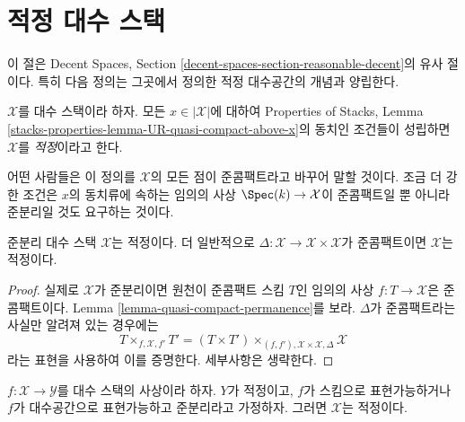 \section{적정 대수 스택}
\label{section-reasonable-decent}

\noindent
이 절은 Decent Spaces, Section
\ref{decent-spaces-section-reasonable-decent}의 유사 절이다. 특히 다음
정의는 그곳에서 정의한 적정 대수공간의 개념과 양립한다.

\begin{definition}
\label{definition-decent}
$\mathcal{X}$를 대수 스택이라 하자. 모든 $x \in |\mathcal{X}|$에 대하여
Properties of Stacks, Lemma
\ref{stacks-properties-lemma-UR-quasi-compact-above-x}의 동치인 조건들이
성립하면 $\mathcal{X}$를 {\it 적정}이라고 한다.
\end{definition}

\noindent
어떤 사람들은 이 정의를 $\mathcal{X}$의 모든 점이 준콤팩트라고 바꾸어
말할 것이다. 조금 더 강한 조건은 $x$의 동치류에 속하는 임의의 사상
$\Spec(k) \to \mathcal{X}$이 준콤팩트일 뿐 아니라 준분리일 것도 요구하는
것이다.

\begin{lemma}
\label{lemma-quasi-separated-decent}
준분리 대수 스택 $\mathcal{X}$는 적정이다. 더 일반적으로
$\Delta : \mathcal{X} \to \mathcal{X} \times \mathcal{X}$가 준콤팩트이면
$\mathcal{X}$는 적정이다.
\end{lemma}

\begin{proof}
실제로 $\mathcal{X}$가 준분리이면 원천이 준콤팩트 스킴 $T$인 임의의
사상 $f : T \to \mathcal{X}$은 준콤팩트이다. Lemma
\ref{lemma-quasi-compact-permanence}를 보라. $\Delta$가 준콤팩트라는
사실만 알려져 있는 경우에는
$$
T \times_{f, \mathcal{X}, f'} T' =
(T \times T')
\times_{(f, f'), \mathcal{X} \times \mathcal{X}, \Delta}
\mathcal{X}
$$
라는 표현을 사용하여 이를 증명한다. 세부사항은 생략한다.
\end{proof}

\begin{lemma}
\label{lemma-representable-decent}
$f : \mathcal{X} \to \mathcal{Y}$를 대수 스택의 사상이라 하자.
$Y$가 적정이고, $f$가 스킴으로 표현가능하거나 $f$가 대수공간으로
표현가능하고 준분리라고 가정하자. 그러면 $\mathcal{X}$는 적정이다.
\end{lemma}

